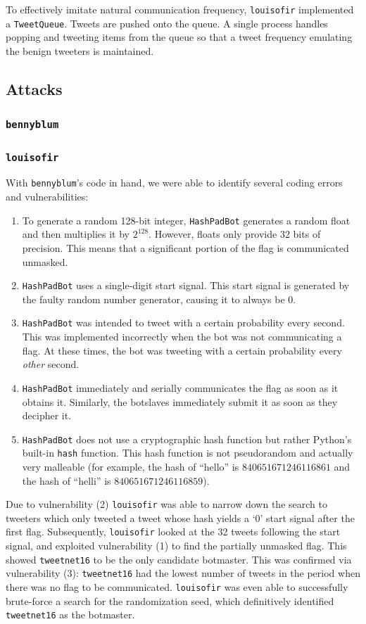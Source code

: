 \documentclass[11pt, oneside]{article} %
\numberwithin{equation}{section} %
\numberwithin{figure}{section} %
\numberwithin{table}{section} %
\renewcommand{\c}[1]{\texttt{#1}}
\newcommand{\teambb}{\c{bennyblum}}
\newcommand{\teamol}{\c{louisofir}}
\begin{document}
			To effectively imitate natural communication frequency, \teamol{} implemented a \c{TweetQueue}. Tweets are pushed onto the queue. A single process handles popping and tweeting items from the queue so that a tweet frequency emulating the benign tweeters is maintained.
	\subsection{Attacks}
		\subsubsection{\teambb{}}

		\subsubsection{\teamol{}}
			With \teambb{}'s code in hand, we were able to identify several coding errors and vulnerabilities:  
			\begin{enumerate}
				\item To generate a random 128-bit integer, \c{HashPadBot} generates a random float and then multiplies it by $2^{128}$.  However, floats only provide 32 bits of precision.  This means that a significant portion of the flag is communicated unmasked.
				\item \c{HashPadBot} uses a single-digit start signal.  This start signal is generated by the faulty random number generator, causing it to always be $0$.
				\item \c{HashPadBot} was intended to tweet with a certain probability every second.  This was implemented incorrectly when the bot was not communicating a flag.  At these times, the bot was tweeting with a certain probability every \emph{other} second.
				\item \c{HashPadBot} immediately and serially communicates the flag as soon as it obtains it.  Similarly, the botslaves immediately submit it as soon as they decipher it.
				\item \c{HashPadBot} does not use a cryptographic hash function but rather Python's built-in \c{hash} function.  This hash function is not pseudorandom and actually very malleable (for example, the hash of ``hello'' is $840651671246116861$ and the hash of ``helli'' is $840651671246116859$).
			\end{enumerate}
			Due to vulnerability (2) \teamol{} was able to narrow down the search to tweeters which only tweeted a tweet whose hash yields a `0' start signal after the first flag.  Subsequently, \teamol{} looked at the 32 tweets following the start signal, and exploited vulnerability (1) to find the partially unmasked flag.  This showed \c{tweetnet16} to be the only candidate botmaster.  This was confirmed via vulnerability (3): \c{tweetnet16} had the lowest number of tweets in the period when there was no flag to be communicated.  \teamol{} was even able to successfully brute-force a search for the randomization seed, which definitively identified \c{tweetnet16} as the botmaster.
\end{document}
